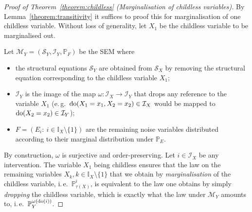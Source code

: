 \begin{proof}[Proof of Theorem~\ref{theorem:childless} (Marginalisation of childless variables)]
By Lemma~\ref{theorem:transitivity} it suffices to proof this for marginalisation of one childless variable.
Without loss of generality, let $X_1$ be the childless variable to be marginalised out.

Let $\mathcal{M}_Y=(\mathcal{S}_Y,\mathcal{I}_Y,\mathbb{P}_F)$ be the SEM where
%
\begin{itemize}
    \item the structural equations $\mathcal{S}_Y$ are obtained from $\mathcal{S}_X$ by removing the structural equation corresponding to the childless variable $X_1$;
    \item $\mathcal{I}_Y$ is the image of the map $\omega:\mathcal{I}_X \to \mathcal{I}_Y$ that drops any reference to the variable $X_1$ (e.\,g.\ ${\operatorname{do}( X_1=x_1, X_2=x_2) \in \mathcal{I}_X}$ would be mapped to $\operatorname{do}(X_2=x_2) \in \mathcal{I}_Y$);
    \item $F = (E_i:\ i \in \mathbb{I}_X\setminus\{1\})$ are the remaining noise variables distributed according to their marginal distribution under $\mathbb{P}_E$.
\end{itemize}
%
By construction, $\omega$ is surjective and order-preserving.
Let $i\in\mathcal{I}_X$ be any intervention.
The variable $X_1$ being childless ensures that the law on the remaining variables $X_k,k\in\mathbb{I}_X\setminus\{1\}$ that we obtain by \emph{marginalisation} of the childless variable, i.\,e.\ $\mathbb{P}_{\tau(X)}^{i}$, is equivalent to the law one obtains by simply \emph{dropping} the childless variable, which is exactly what the law under $\mathcal{M}_Y$ amounts to, i.\,e.\ $\mathbb{P}_Y^{\omega({\operatorname{do}(i)})}$.
\end{proof}





